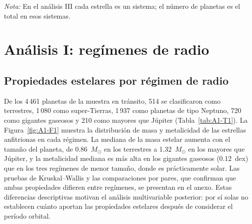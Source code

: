 \begin{table}[htbp]
    \centering
    \caption{Submuestras utilizadas en los tres análisis.}
    \label{tab:D-T8}
    \small
    \par\smallskip
    {\footnotesize\textit{Nota:} En el análisis III cada estrella es un sistema; el número de planetas es el total en esos sistemas.}
\end{table}

\section{Análisis I: regímenes de radio}
\label{sec:res-analisis-I}

\subsection{Propiedades estelares por régimen de radio}
\label{sec:res-regimenes-descripcion}

De los 4\,461 planetas de la muestra en tránsito, 514 se clasificaron como terrestres, 1\,080 como super-Tierras, 1\,937 como planetas de tipo Neptuno, 720 como gigantes gaseosos y 210 como mayores que Júpiter (Tabla~\ref{tab:A1-T1}). La Figura~\ref{fig:A1-F1} muestra la distribución de masa y metalicidad de las estrellas anfitrionas en cada régimen. La mediana de la masa estelar aumenta con el tamaño del planeta, de 0.86~$M_\odot$ en los terrestres a 1.32~$M_\odot$ en los mayores que Júpiter, y la metalicidad mediana es más alta en los gigantes gaseosos (0.12~dex) que en los tres regímenes de menor tamaño, donde es prácticamente solar. Las pruebas de Kruskal--Wallis y las comparaciones por pares, que confirman que ambas propiedades difieren entre regímenes, se presentan en el anexo. Estas diferencias descriptivas motivan el análisis multivariable posterior: por sí solas no establecen cuánto aportan las propiedades estelares después de considerar el período orbital.

